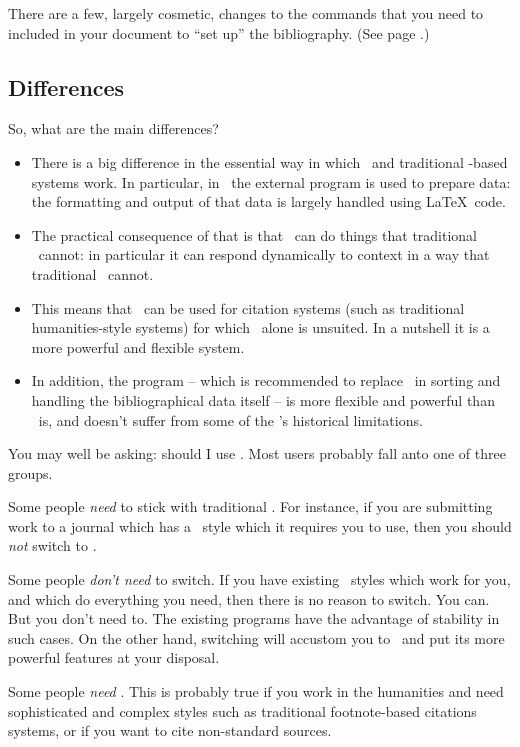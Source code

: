 There are a few, largely cosmetic, changes to the commands that you need to included in your document to ``set up'' the bibliography. (See page \pageref{bibtex:simple:eg}.)

\subsection{Differences}

So, what are the main differences?
\begin{itemize}
\item There is a big difference in the essential way in which \biblatex\ and traditional \bibtex-based systems work. In particular, in \biblatex\ the external program is used to prepare data: the formatting and output of that data is largely handled using \LaTeX\ code.
\item The practical consequence of that is that \biblatex\ can do things that traditional \bibtex\ cannot: in particular it can respond dynamically to context in a way that traditional \bibtex\ cannot.
\item This means that \biblatex\ can be used for citation systems (such as traditional humanities-style systems) for which \bibtex\ alone is unsuited. In a nutshell it is a more powerful and flexible system.
\item In addition, the  program -- which is recommended to replace \bibtex\ in sorting and handling the bibliographical data itself -- is more flexible and powerful than \bibtex\ is, and doesn't suffer from some of the \bibtex's historical limitations.
\end{itemize}

You may well be asking: should I use \biblatex. Most users probably fall anto one of three groups.

Some people \emph{need} to stick with traditional \bibtex. For instance, if you are submitting work to a journal which has a \bibtex\ style which it requires you to use, then you should \emph{not} switch to \biblatex.

Some people \emph{don't need} to switch. If you have existing \bibtex\ styles which work for you, and which do everything you need, then there is no reason to switch. You can. But you don't need to. The existing programs have the advantage of stability in such cases. On the other hand, switching will accustom you to \biblatex\ and put its more powerful features at your disposal.

Some people \emph{need} \biblatex. This is probably true if you work in the humanities and need sophisticated and complex styles such as traditional footnote-based citations systems, or if you want to cite non-standard sources.

